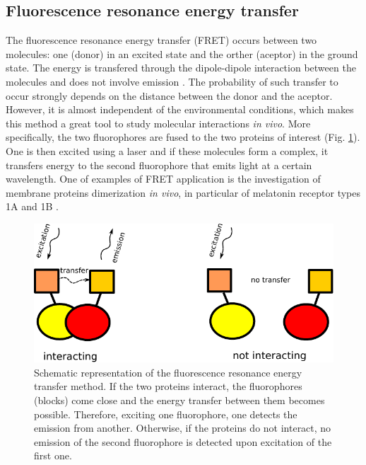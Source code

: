 \subsection{Fluorescence resonance energy transfer}
The fluorescence resonance energy transfer (FRET) occurs between two molecules: one (donor) in an excited state and the orther (aceptor) in the ground state. 
The energy is transfered through the dipole-dipole interaction between the molecules and does not involve emission \cite{yan2003analysis}. The probability of such transfer to occur
strongly depends on the distance between the donor and the aceptor. However, it is almost independent of the environmental conditions, which makes this method a great
tool to study molecular interactions \emph{in vivo}. More specifically, the two fluorophores are fused to the two proteins of interest (Fig. \ref{Fig:FRET}). One is then excited using 
a laser and if these molecules form a complex, it transfers energy to the second fluorophore that emits light at a certain wavelength. One of examples
of FRET application is the investigation of membrane proteins dimerization \emph{in vivo}, in particular of melatonin receptor types 1A and 1B \cite{ayoub2004preferential}.

\begin{figure}[H]
    \begin{centering}
      \includegraphics[width=0.5\linewidth]{Intro/Fig/FRET.pdf}  
      \caption[FRET explanation]{Schematic representation of the fluorescence resonance energy transfer method. If the two proteins interact, the fluorophores (blocks) come close and the energy
      transfer between them becomes possible. Therefore, exciting one fluorophore, one detects the emission from another. Otherwise, if the proteins do not interact,
      no emission of the second fluorophore is detected upon excitation of the first one.}
      \label{Fig:FRET}
    \end{centering}
\end{figure}

